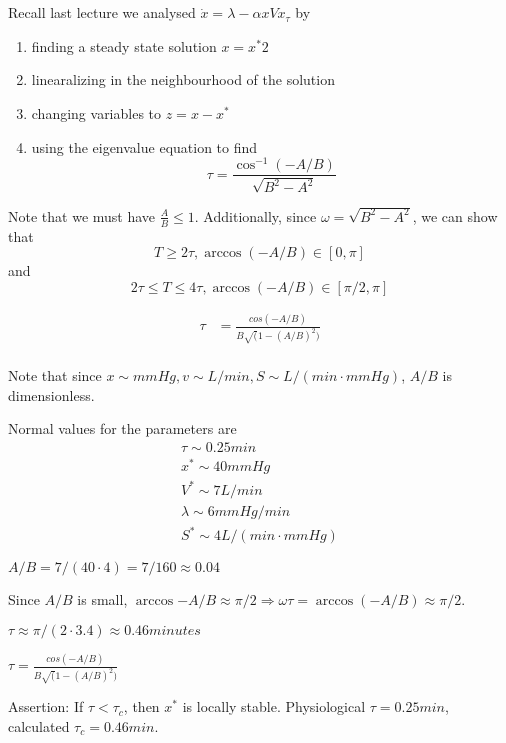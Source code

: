 \section{}

Recall last lecture we analysed $\dot{x} = \lambda - \alpha x V x_\tau$ by
\begin{enumerate}
  \item finding a steady state solution $x=x^*2$
  \item linearalizing in the neighbourhood of the solution
  \item changing variables to $z = x- x^*$
  \item using the eigenvalue equation to find \[\tau =\frac{\cos^{-1} (-A/B)} {\sqrt{B^2-A^2}}\]
\end{enumerate}

Note that we must have 
$\frac{A}{B}\le1$. Additionally, since $\omega=\sqrt{B^2-A^2}$, we can show that \[T\ge2\tau, \arccos(-A/B)\in [0,\pi]\] and \[2\tau\le T\le 4\tau, \arccos(-A/B)\in [\pi/2, \pi]\]


\begin{align*}
  \tau &= \frac{cos(-A/B)}{B\sqrt(1-(A/B)^2)}\\
\end{align*}

Note that since $x\sim mmHg, v\sim L/min, S\sim L/(min\cdot mmHg)$, $A/B$ is dimensionless.

Normal values for the parameters are
\begin{align*}
  \tau\sim 0.25min\\
  x^*\sim 40mmHg\\
  V^*\sim 7L/min\\
  \lambda\sim 6 mmHg/min\\
  S^*\sim 4L/(min\cdot mmHg)
\end{align*}

$A/B = 7/(40\cdot 4) =7/160 \approx 0.04$

Since $A/B$ is small, $\arccos{-A/B} \approx \pi/2 \Rightarrow \omega\tau = \arccos(-A/B)\approx \pi/2$.


$\tau \approx \pi/(2\cdot 3.4)\approx 0.46 minutes$

$\tau = \frac{cos(-A/B)}{B\sqrt(1-(A/B)^2)}$

Assertion: If $\tau < \tau_c$, then $x^*$ is locally stable. Physiological $\tau=0.25min$, calculated $\tau_c = 0.46 min$.

